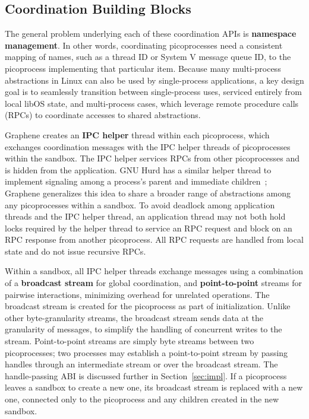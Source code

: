 \subsection{Coordination Building Blocks}
\label{sec:namespaces:blocks}

The general problem underlying each of these coordination APIs is 
{\bf namespace management}.  In other words, coordinating picoprocesses need 
a consistent mapping of names, such as a thread ID or System V message queue ID, 
to the picoprocess implementing that particular item.  
Because many multi-process abstractions in Linux can also be used by single-process applications,
a key design goal is to seamlessly transition between single-process uses, serviced 
entirely from local libOS state, and multi-process cases, which
leverage remote procedure calls (RPCs) to coordinate accesses to shared abstractions.


Graphene creates an  {\bf IPC helper} thread within each picoprocess,
which exchanges coordination messages with the IPC helper threads of picoprocesses 
within the sandbox. %
The IPC helper
services RPCs from other picoprocesses and is
hidden from the application. 
GNU Hurd has a similar helper thread to implement signaling among a process's parent and
immediate children~\cite{hurd};
Graphene generalizes this idea to share a broader range of abstractions among any picoprocesses
within a sandbox.
To avoid deadlock among application threads and the IPC helper thread, 
an application thread may not both hold locks required by the helper thread to service an RPC request
and block
on an RPC response from another picoprocess.
All RPC requests are handled from local state and do not issue recursive RPCs.%

Within a sandbox, all IPC helper threads exchange messages using a
combination of a {\bf broadcast stream} for global coordination,
and {\bf point-to-point} streams for pairwise interactions, 
minimizing overhead for unrelated operations.
The broadcast stream is created for the picoprocess as part of initialization.
Unlike other byte-granularity streams, the broadcast stream sends data at the granularity of messages,
to simplify the handling of concurrent writes to the stream.
Point-to-point streams are simply byte streams between two picoprocesses;
two processes may establish a point-to-point stream by passing handles through 
an intermediate stream or over the broadcast stream.
The handle-passing ABI is discussed further in Section~\ref{sec:impl}.
If a picoprocess leaves a sandbox to create a new one,
its broadcast stream is replaced
with a new one, connected only to the picoprocess and any children created in the
new sandbox.

